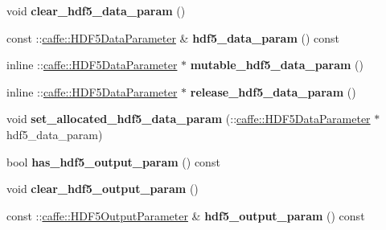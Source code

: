 \begin{DoxyCompactItemize}
\mbox{\label{classcaffe_1_1_layer_parameter_a3fa058a9cd3e206cb10e6f126f85cd73}} 
void {\bfseries clear\+\_\+hdf5\+\_\+data\+\_\+param} ()
\item 
\mbox{\label{classcaffe_1_1_layer_parameter_ab9a046c0917950605d245178a8abd90e}} 
const \+::\mbox{\hyperlink{classcaffe_1_1_h_d_f5_data_parameter}{caffe\+::\+H\+D\+F5\+Data\+Parameter}} \& {\bfseries hdf5\+\_\+data\+\_\+param} () const
\item 
\mbox{\label{classcaffe_1_1_layer_parameter_a5906ca7589d28e8d7a68198f41bad7d6}} 
inline \+::\mbox{\hyperlink{classcaffe_1_1_h_d_f5_data_parameter}{caffe\+::\+H\+D\+F5\+Data\+Parameter}} $\ast$ {\bfseries mutable\+\_\+hdf5\+\_\+data\+\_\+param} ()
\item 
\mbox{\label{classcaffe_1_1_layer_parameter_a9c892b34607820f5773cdb45cee5f912}} 
inline \+::\mbox{\hyperlink{classcaffe_1_1_h_d_f5_data_parameter}{caffe\+::\+H\+D\+F5\+Data\+Parameter}} $\ast$ {\bfseries release\+\_\+hdf5\+\_\+data\+\_\+param} ()
\item 
\mbox{\label{classcaffe_1_1_layer_parameter_a9f0867bd7a30afcb9b67e1bd5a743c2c}} 
void {\bfseries set\+\_\+allocated\+\_\+hdf5\+\_\+data\+\_\+param} (\+::\mbox{\hyperlink{classcaffe_1_1_h_d_f5_data_parameter}{caffe\+::\+H\+D\+F5\+Data\+Parameter}} $\ast$hdf5\+\_\+data\+\_\+param)
\item 
\mbox{\label{classcaffe_1_1_layer_parameter_a0af0da719baafa467bf1007a12e051a0}} 
bool {\bfseries has\+\_\+hdf5\+\_\+output\+\_\+param} () const
\item 
\mbox{\label{classcaffe_1_1_layer_parameter_a747caef20ba4c8ef7e1e3fec350166b9}} 
void {\bfseries clear\+\_\+hdf5\+\_\+output\+\_\+param} ()
\item 
\mbox{\label{classcaffe_1_1_layer_parameter_a0333c6527c19b6573817b36703d79204}} 
const \+::\mbox{\hyperlink{classcaffe_1_1_h_d_f5_output_parameter}{caffe\+::\+H\+D\+F5\+Output\+Parameter}} \& {\bfseries hdf5\+\_\+output\+\_\+param} () const

\end{DoxyCompactItemize}

